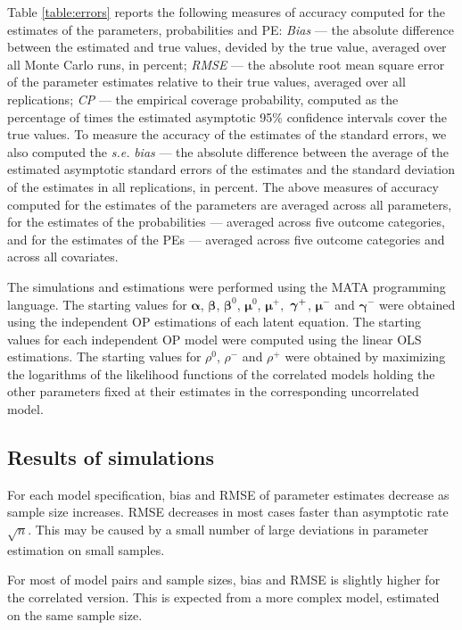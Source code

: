 \documentclass[letterpaper,fleqn,11pt]{article}
\begin{document}
\begin{onehalfspace}
Table \ref{table:errors} reports the following measures of accuracy computed
for the estimates of the parameters, probabilities and PE: \emph{Bias} ---
the absolute difference between the estimated and true values, devided by
the true value, averaged over all Monte Carlo runs, in percent; \emph{RMSE}
--- the absolute root mean square error of the parameter estimates relative
to their true values, averaged over all replications; \emph{CP} --- the
empirical coverage probability, computed as the percentage of times the
estimated asymptotic 95\% confidence intervals cover the true values. To
measure the accuracy of the estimates of the standard errors, we also
computed the \emph{s.e.} \emph{bias} --- the absolute difference between the
average of the estimated asymptotic standard errors of the estimates and the
standard deviation of the estimates in all replications, in percent. The
above measures of accuracy computed for the estimates of the parameters are
averaged across all parameters, for the estimates of the probabilities ---
averaged across five outcome categories, and for the estimates of the PEs
--- averaged across five outcome categories and across all covariates.

The simulations and estimations were performed using the MATA programming
language. The starting values for $\mathbf{\alpha }$, $\mathbf{\beta }$, $%
\mathbf{\beta }^{0}$, $\mathbf{\mu }^{0}$, $\mathbf{\mu }^{+},$ $\mathbf{%
\gamma }^{+}$, $\mathbf{\mu }^{-}$ and $\mathbf{\gamma }^{-}$ were obtained
using the independent OP estimations of each latent equation. The starting
values for each independent OP model were computed using the linear OLS
estimations. The starting values for $\rho ^{0}$, $\rho ^{-}$ and $\rho ^{+}$
were obtained by maximizing the logarithms of the likelihood functions of
the correlated models holding the other parameters fixed at their estimates
in the corresponding uncorrelated model.

\subsection*{Results of simulations}

For each model specification, bias and RMSE of parameter estimates decrease
as sample size increases. RMSE decreases in most cases faster than
asymptotic rate $\sqrt{n}$. This may be caused by a small number of large
deviations in parameter estimation on small samples.

For most of model pairs and sample sizes, bias and RMSE is slightly higher
for the correlated version. This is expected from a more complex model,
estimated on the same sample size.


\end{onehalfspace}
\end{document}
